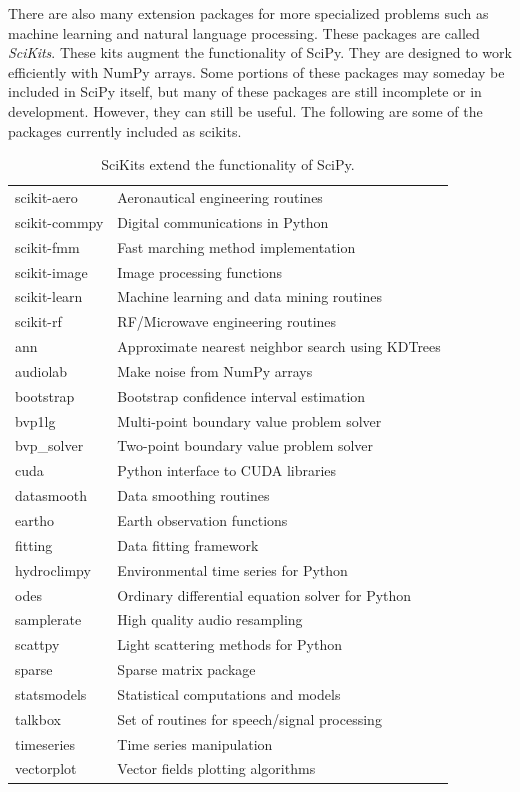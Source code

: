 There are also many extension packages for more specialized problems such as machine learning and natural language processing.
These packages are called \emph{SciKits}.
These kits augment the functionality of SciPy.
They are designed to work efficiently with NumPy arrays.
Some portions of these packages may someday be included in SciPy itself, but many of these packages are still incomplete or in development.
However, they can still be useful.
The following are some of the packages currently included as scikits.
\begin{table}[h]
\centering
\begin{tabular}{|l|l|}
\hline
scikit-aero & Aeronautical engineering routines \\
scikit-commpy & Digital communications in Python \\
scikit-fmm & Fast marching method implementation \\
scikit-image & Image processing functions \\
scikit-learn & Machine learning and data mining routines \\
scikit-rf & RF/Microwave engineering routines \\
ann & Approximate nearest neighbor search using KDTrees \\
audiolab & Make noise from NumPy arrays \\
bootstrap & Bootstrap confidence interval estimation \\
bvp1lg & Multi-point boundary value problem solver \\
bvp\_solver & Two-point boundary value problem solver \\
cuda & Python interface to CUDA libraries \\
datasmooth & Data smoothing routines \\
eartho & Earth observation functions \\
fitting & Data fitting framework \\
hydroclimpy & Environmental time series for Python \\
odes & Ordinary differential equation solver for Python \\
samplerate & High quality audio resampling \\
scattpy & Light scattering methods for Python \\
sparse & Sparse matrix package \\
statsmodels & Statistical computations and models \\
talkbox & Set of routines for speech/signal processing \\
timeseries & Time series manipulation \\
vectorplot & Vector fields plotting algorithms \\
\hline
\end{tabular}
\caption{SciKits extend the functionality of SciPy.}
\end{table}
